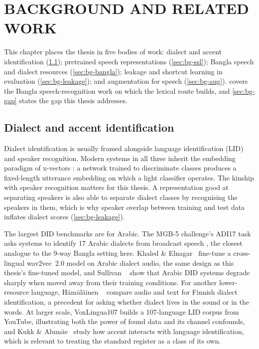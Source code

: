 \chapter{BACKGROUND AND RELATED WORK}
\label{ch:background}

This chapter places the thesis in five bodies of work: dialect and accent
identification (\cref{sec:bg-did}); pretrained speech representations
(\cref{sec:bg-ssl}); Bangla speech and dialect resources
(\cref{sec:bg-bangla}); leakage and shortcut learning in evaluation
(\cref{sec:bg-leakage}); and augmentation for speech (\cref{sec:bg-aug}).
 covers the Bangla speech-recognition work on which the
lexical route builds, and \cref{sec:bg-gap} states the gap this thesis
addresses.

\section{Dialect and accent identification}
\label{sec:bg-did}

Dialect identification is usually framed alongside language identification
(LID) and speaker recognition. Modern systems in all three inherit the embedding
paradigm of x-vectors \cite{Snyder2018Xvectors}: a network trained to
discriminate classes produces a fixed-length utterance embedding on which a
light classifier operates. The kinship with speaker recognition matters for
this thesis. A representation good at separating speakers is also able to
separate dialect classes by recognising the speakers in them, which is why
speaker overlap between training and test data inflates dialect scores
(\cref{sec:bg-leakage}).

The largest DID benchmarks are for Arabic. The MGB-5 challenge's ADI17 task
asks systems to identify 17 Arabic dialects from broadcast speech
\cite{Ali2019MGB5}, the closest analogue to the 9-way Bangla setting here.
Khaled \& Elnagar~\cite{Khaled2025Arabic} fine-tune a cross-lingual wav2vec~2.0 model on Arabic
dialect audio, the same design as this thesis's fine-tuned model, and
Sullivan \etal~\cite{Sullivan2023Robustness} show that Arabic DID systems degrade sharply when
moved away from their training conditions. For another lower-resource language,
H\"{a}m\"{a}l\"{a}inen \etal~\cite{Hamalainen2021Finnish} compare audio and text for Finnish dialect
identification, a precedent for asking whether dialect lives in the sound or in
the words. At larger scale, VoxLingua107 \cite{Valk2021VoxLingua107} builds a
107-language LID corpus from YouTube, illustrating both the power of found data
and its channel confounds, and Kukk \& Alum\"{a}e~\cite{Kukk2022Improving} study how accent
interacts with language identification, which is relevant to treating the
standard register as a class of its own.

